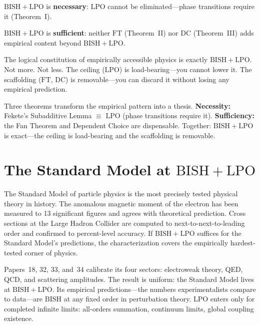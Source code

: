 \documentclass[11pt,a4paper]{report}
\theoremstyle{plain}
\theoremstyle{definition}
\theoremstyle{remark}
\newcommand{\BISH}{\mathrm{BISH}}
\newcommand{\LPO}{\mathrm{LPO}}
\newcommand{\FT}{\mathrm{FT}}
\newcommand{\DC}{\mathrm{DC}}
\begin{document}
$\BISH+\LPO$ is \textbf{necessary}: $\LPO$ cannot be eliminated---phase transitions require it (Theorem~I).

$\BISH+\LPO$ is \textbf{sufficient}: neither $\FT$ (Theorem~II) nor $\DC$ (Theorem~III) adds empirical content beyond $\BISH+\LPO$.

The logical constitution of empirically accessible physics is exactly $\BISH+\LPO$. Not more. Not less. The ceiling ($\LPO$) is load-bearing---you cannot lower it. The scaffolding ($\FT$, $\DC$) is removable---you can discard it without losing any empirical prediction.

\begin{chapterbox}
Three theorems transform the empirical pattern into a thesis. \textbf{Necessity:} Fekete's Subadditive Lemma $\equiv$ $\LPO$ (phase transitions require it). \textbf{Sufficiency:} the Fan Theorem and Dependent Choice are dispensable. Together: $\BISH+\LPO$ is exact---the ceiling is load-bearing and the scaffolding is removable.
\end{chapterbox}

\chapter{The Standard Model at $\BISH+\LPO$}

The Standard Model of particle physics is the most precisely tested physical theory in history. The anomalous magnetic moment of the electron has been measured to 13 significant figures and agrees with theoretical prediction. Cross sections at the Large Hadron Collider are computed to next-to-next-to-leading order and confirmed to percent-level accuracy. If $\BISH+\LPO$ suffices for the Standard Model's predictions, the characterization covers the empirically hardest-tested corner of physics.

Papers~18, 32, 33, and~34 calibrate its four sectors: electroweak theory, QED, QCD, and scattering amplitudes. The result is uniform: the Standard Model lives at $\BISH+\LPO$. Its empirical predictions---the numbers experimentalists compare to data---are $\BISH$ at any fixed order in perturbation theory. $\LPO$ enters only for completed infinite limits: all-orders summation, continuum limits, global coupling existence.
\end{document}
